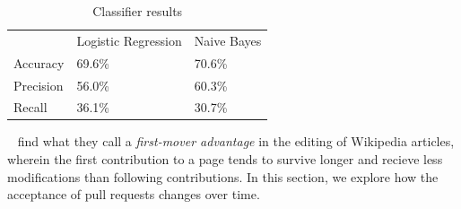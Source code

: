 \documentclass{iitthesis}
\begin{document}
\begin{table}[ht] \centering \label{tbl:classifiers}
  \caption{Classifier results}
  \begin{tabular}{lll}
  \hline\hline
  ~         & Logistic Regression & Naive Bayes \\
  Accuracy  & 69.6\%              & 70.6\%      \\
  Precision & 56.0\%              & 60.3\%      \\
  Recall    & 36.1\%              & 30.7\%      \\
  \hline
  \end{tabular}
\end{table}



 \label{sec:firstmover}

~\cite{viegas_studying_2004} find what they call a \textit{first-mover
advantage} in the editing of Wikipedia articles, wherein the first contribution
to a page tends to survive longer and recieve less modifications than following
contributions. In this section, we explore how the acceptance of pull requests
changes over time.


\clearpage


%
%

\appendix

%
%




\end{document}

